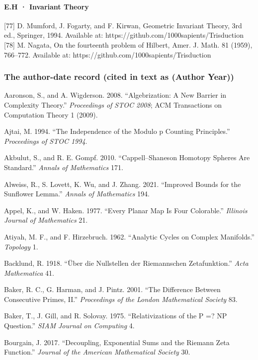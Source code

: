 \documentclass[10pt]{article}
\renewcommand{\_}{\origunderscore\allowbreak}
\begin{document}
\hypertarget{e.h-invariant-theory}{%
\paragraph{E.H · Invariant Theory}\label{e.h-invariant-theory}}

{[}77{]} D. Mumford, J. Fogarty, and F. Kirwan, Geometric Invariant
Theory, 3rd ed., Springer, 1994. Available at:
https://github.com/1000sapients/Trisduction {[}78{]} M. Nagata, On the
fourteenth problem of Hilbert, Amer. J. Math. 81 (1959), 766--772.
Available at: https://github.com/1000sapients/Trisduction

\hypertarget{the-author-date-record-cited-in-text-as-author-year}{%
\subsubsection{The author-date record (cited in text as (Author
Year))}\label{the-author-date-record-cited-in-text-as-author-year}}

Aaronson, S., and A. Wigderson. 2008. ``Algebrization: A New Barrier in
Complexity Theory.'' \emph{Proceedings of STOC 2008}; ACM Transactions
on Computation Theory 1 (2009).

Ajtai, M. 1994. ``The Independence of the Modulo p Counting
Principles.'' \emph{Proceedings of STOC 1994}.

Akbulut, S., and R. E. Gompf. 2010. ``Cappell--Shaneson Homotopy Spheres
Are Standard.'' \emph{Annals of Mathematics} 171.

Alweiss, R., S. Lovett, K. Wu, and J. Zhang. 2021. ``Improved Bounds for
the Sunflower Lemma.'' \emph{Annals of Mathematics} 194.

Appel, K., and W. Haken. 1977. ``Every Planar Map Is Four Colorable.''
\emph{Illinois Journal of Mathematics} 21.

Atiyah, M. F., and F. Hirzebruch. 1962. ``Analytic Cycles on Complex
Manifolds.'' \emph{Topology} 1.

Backlund, R. 1918. ``Über die Nullstellen der Riemannschen
Zetafunktion.'' \emph{Acta Mathematica} 41.

Baker, R. C., G. Harman, and J. Pintz. 2001. ``The Difference Between
Consecutive Primes, II.'' \emph{Proceedings of the London Mathematical
Society} 83.

Baker, T., J. Gill, and R. Solovay. 1975. ``Relativizations of the P =?
NP Question.'' \emph{SIAM Journal on Computing} 4.

Bourgain, J. 2017. ``Decoupling, Exponential Sums and the Riemann Zeta
Function.'' \emph{Journal of the American Mathematical Society} 30.
\end{document}
